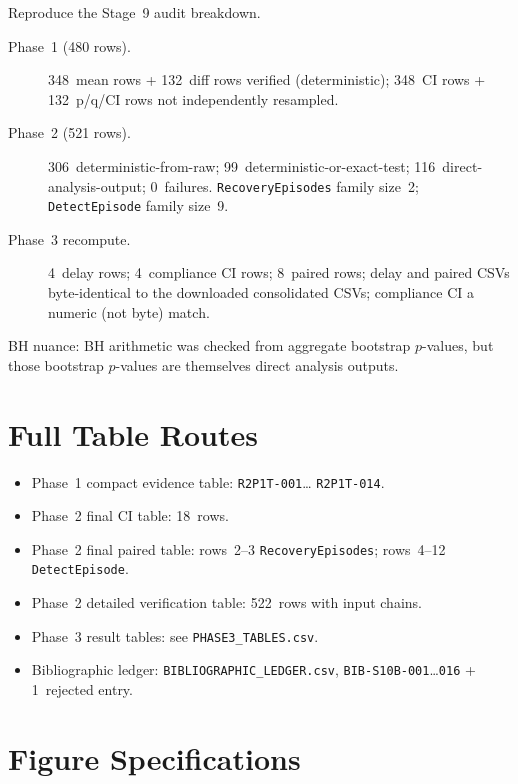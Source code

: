 \documentclass[12pt, a4paper, oneside]{memoir}
\begin{document}
Reproduce the Stage~9 audit breakdown.

\begin{description}
  \item[Phase~1 (480 rows).]
    348~mean rows + 132~diff rows verified (deterministic); 348~CI rows +
    132~p/q/CI rows not independently resampled.

  \item[Phase~2 (521 rows).]
    306~deterministic-from-raw; 99~deterministic-or-exact-test;
    116~direct-analysis-output; 0~failures.
    \texttt{RecoveryEpisodes} family size~2;
    \texttt{DetectEpisode} family size~9.

  \item[Phase~3 recompute.]
    4~delay rows; 4~compliance CI rows; 8~paired rows; delay and paired CSVs
    byte-identical to the downloaded consolidated CSVs; compliance CI a
    numeric (not byte) match.
\end{description}

BH nuance: BH arithmetic was checked from aggregate bootstrap $p$-values,
but those bootstrap $p$-values are themselves direct analysis outputs.

\chapter{Full Table Routes}
\label{app:tables}

\begin{itemize}
  \item Phase~1 compact evidence table: \texttt{R2P1T-001}\ldots%
        \texttt{R2P1T-014}.
  \item Phase~2 final CI table: 18~rows.
  \item Phase~2 final paired table: rows~2--3 \texttt{RecoveryEpisodes};
        rows~4--12 \texttt{DetectEpisode}.
  \item Phase~2 detailed verification table: 522~rows with input chains.
  \item Phase~3 result tables: see \texttt{PHASE3\_TABLES.csv}.
  \item Bibliographic ledger: \texttt{BIBLIOGRAPHIC\_LEDGER.csv},
        \texttt{BIB-S10B-001}\ldots\texttt{016} + 1~rejected entry.
\end{itemize}

\chapter{Figure Specifications}
\label{app:figures}
\end{document}
